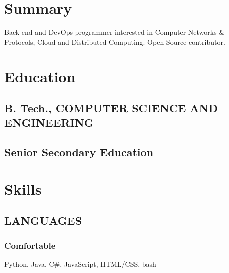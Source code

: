 \documentclass[letterpaper]{deedy-resume} %
\begin{document}
\begin{minipage}[t]{0.33\textwidth} %


\section{Summary}
Back end and DevOps programmer interested in Computer Networks \& Protocols, Cloud and Distributed Computing. Open Source contributor.
\sectionspace %



\section{Education} 


\subsection{B. Tech., COMPUTER SCIENCE AND ENGINEERING }

\sectionspace %

\subsection{Senior Secondary Education}
\sectionspace %


\section{Skills}
\subsection{LANGUAGES}
\subsubsection*{Comfortable}
\squeezeup
Python, Java, C\#, JavaScript, HTML/CSS, bash
\subsectionspace %

\end{minipage}
\end{document}
